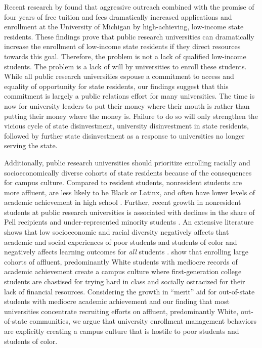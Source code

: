 \documentclass[twoside]{article}
\begin{document}
Recent research by \cite{RN4408} found that aggressive outreach combined with the promise of four years of free tuition and fees dramatically increased applications and enrollment at the University of Michigan by high-achieving, low-income state residents.  These findings prove that public research universities can dramatically increase the enrollment of low-income state residents if they direct resources towards this goal. Therefore, the problem is not a lack of qualified low-income students. The problem is a lack of will by universities to enroll these students. While all public research universities espouse a commitment to access and equality of opportunity for state residents, our findings suggest that this commitment is largely a public relations effort for many universities. The time is now for university leaders to put their money where their mouth is rather than putting their money where the money is.  Failure to do so will only strengthen the vicious cycle of state disinvestment, university disinvestment in state residents, followed by further state disinvestment as a response to universities no longer serving the state.

Additionally, public research universities should prioritize enrolling racially and socioeconomically diverse cohorts of state residents because of the consequences for campus culture. Compared to resident students, nonresident students are more affluent, are less likely to be Black or Latinx, and often have lower levels of academic achievement in high school \citep{RN3685}.  Further, recent growth in nonresident students at public research universities is associated with declines in the share of Pell recipients and under-represented minority students \citep{RN3685}.  An extensive literature shows that low socioeconomic and racial diversity negatively affects that academic and social experiences of poor students and students of color \citep[e.g., ][]{RN3205,RN3193,RN3639,RN3185} and negatively affects learning outcomes for \textit{all} students \citep[e.g., ][]{RN3026,RN2576,RN3153,RN3174}. \cite{RN4231} show that enrolling large cohorts of affluent, predominantly White students with mediocre records of academic achievement create a campus culture where first-generation college students are chastised for trying hard in class and socially ostracized for their lack of financial resources.  Considering the growth in ``merit'' aid for out-of-state students with mediocre academic achievement \citep[e.g., ][]{RN4032,RN4409,RN3762} and our finding that most universities concentrate recruiting efforts on affluent, predominantly White, out-of-state communities, we argue that university enrollment management behaviors are explicitly creating a campus culture that is hostile to poor students and students of color.
\end{document}
